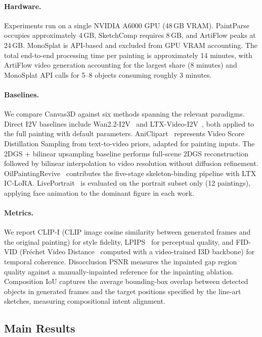 \paragraph{Hardware.}
Experiments run on a single NVIDIA A6000 GPU (48\,GB VRAM). PaintParse occupies
approximately 4\,GB, SketchComp requires 8\,GB, and ArtiFlow peaks at 24\,GB.
MonoSplat is API-based and excluded from GPU VRAM accounting. The total
end-to-end processing time per painting is approximately 14 minutes, with
ArtiFlow video generation accounting for the largest share (8 minutes) and
MonoSplat API calls for 5--8 objects consuming roughly 3 minutes.

\paragraph{Baselines.}
We compare Canvas3D against six methods spanning the relevant paradigms. Direct
I2V baselines include Wan2.2-I2V~\cite{wan2025} and LTX-Video-I2V~\cite{ltxvideo2024},
both applied to the full painting with default parameters. AniClipart~\cite{wu2025aniclipart}
represents Video Score Distillation Sampling from text-to-video priors, adapted
for painting inputs. The 2DGS + bilinear upsampling baseline performs full-scene
2DGS reconstruction followed by bilinear interpolation to video resolution
without diffusion refinement. OilPaintingRevive~\cite{oilpaintingrevive2026}
contributes the five-stage skeleton-binding pipeline with LTX IC-LoRA.
LivePortrait~\cite{guo2024liveportrait} is evaluated on the portrait subset only
(12 paintings), applying face animation to the dominant figure in each work.

\paragraph{Metrics.}
We report CLIP-I (CLIP image cosine similarity between generated frames and the
original painting) for style fidelity, LPIPS~\cite{zhang2018lpips} for
perceptual quality, and FID-VID (Fr\'echet Video Distance~\cite{balaji2019fvd}
computed with a video-trained I3D backbone) for temporal coherence. Disocclusion
PSNR measures the inpainted gap region quality against a manually-inpainted
reference for the inpainting ablation. Composition IoU captures the average
bounding-box overlap between detected objects in generated frames and the target
positions specified by the line-art sketches, measuring compositional intent
alignment.

\subsection{Main Results}

